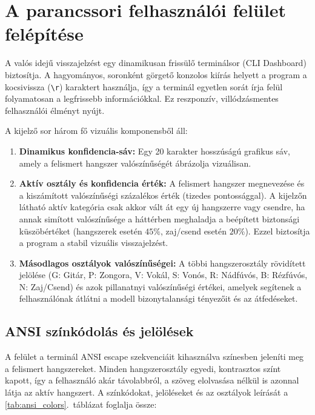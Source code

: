 \section{A parancssori felhasználói felület felépítése}
\label{sec:cli_dashboard}

A valós idejű visszajelzést egy dinamikusan frissülő terminálsor (CLI Dashboard) biztosítja. A hagyományos, soronként görgető konzolos kiírás helyett a program a kocsivissza (\texttt{\textbackslash r}) karaktert használja, így a terminál egyetlen sorát írja felül folyamatosan a legfrissebb információkkal. Ez reszponzív, villódzásmentes felhasználói élményt nyújt.

A kijelző sor három fő vizuális komponensből áll:
\begin{enumerate}
    \item \textbf{Dinamikus konfidencia-sáv:} Egy 20 karakter hosszúságú grafikus sáv, amely a felismert hangszer valószínűségét ábrázolja vizuálisan. 
    \item \textbf{Aktív osztály és konfidencia érték:} A felismert hangszer megnevezése és a kiszámított valószínűségi százalékos érték (tizedes pontossággal). A kijelzőn látható aktív kategória csak akkor vált át egy új hangszerre vagy csendre, ha annak simított valószínűsége a háttérben meghaladja a beépített biztonsági küszöbértéket (hangszerek esetén $45\%$, zaj/csend esetén $20\%$). Ezzel biztosítja a program a stabil vizuális visszajelzést.
    \item \textbf{Másodlagos osztályok valószínűségei:} A többi hangszerosztály rövidített jelölése (G: Gitár, P: Zongora, V: Vokál, S: Vonós, R: Nádfúvós, B: Rézfúvós, N: Zaj/Csend) és azok pillanatnyi valószínűségi értékei, amelyek segítenek a felhasználónak átlátni a modell bizonytalansági tényezőit és az átfedéseket.
\end{enumerate}

\subsection{ANSI színkódolás és jelölések}

A felület a terminál ANSI escape szekvenciáit kihasználva színesben jeleníti meg a felismert hangszereket. Minden hangszerosztály egyedi, kontrasztos színt kapott, így a felhasználó akár távolabbról, a szöveg elolvasása nélkül is azonnal látja az aktív hangszert. A színkódokat, jelöléseket és az osztályok leírását a \ref{tab:ansi_colors}.~táblázat foglalja össze:

